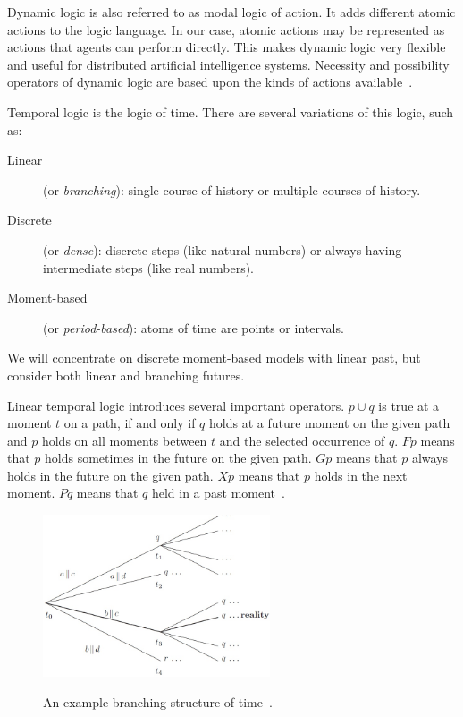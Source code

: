 Dynamic logic is also referred to as modal logic of action.
It adds different atomic actions to the logic language.
In our case, atomic actions may be represented as actions that agents can perform directly.
This makes dynamic logic very flexible and useful for distributed artificial intelligence systems.
Necessity and possibility operators of dynamic logic are based upon the kinds of actions available~\cite{Kozen_90}.

Temporal logic is the logic of time.
There are several variations of this logic, such as:
\begin{description}
  \item[Linear] (or \emph{branching}): single course of history or multiple courses of history.
  \item[Discrete] (or \emph{dense}): discrete steps (like natural numbers) or always having intermediate steps (like real numbers).
  \item[Moment-based] (or \emph{period-based}): atoms of time are points or intervals.
\end{description}
We will concentrate on discrete moment-based models with linear past, but consider both linear and branching futures.

Linear temporal logic introduces several important operators. $p\cup q$ is true at a moment $t$ on a path, if and only if $q$ holds at a future moment on the given path and $p$ holds on all moments between $t$ and the selected occurrence of $q$.
$Fp$ means that $p$ holds sometimes in the future on the given path.
$Gp$ means that $p$ always holds in the future on the given path.
$Xp$ means that $p$ holds in the next moment.
$Pq$ means that $q$ held in a past moment~\cite{Singh_99}.

\begin{figure}[h!]
  \caption{An example branching structure of time~\cite{Singh_99}.}
  \centering
  \includegraphics[width=0.6\textwidth]{images/branching_logic.png}
  \label{fig:for_branching_figure}
\end{figure}

